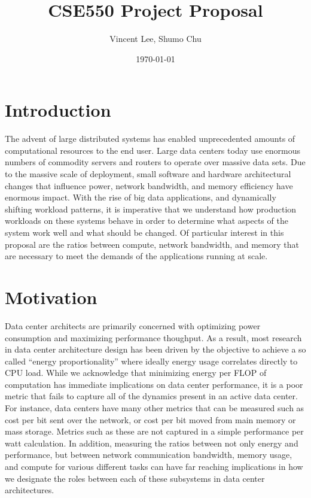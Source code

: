 \documentclass{article}
\begin{document}
\title{CSE550 Project Proposal}
\author{Vincent Lee, Shumo Chu}
\date{\today}

\maketitle

\tableofcontents


\section{Introduction}

The advent of large distributed systems has enabled unprecedented amounts of computational resources to the end user.
Large data centers today use enormous numbers of commodity servers and routers to operate over massive data sets.
Due to the massive scale of deployment, small software and hardware architectural changes that influence power, network bandwidth, and memory efficiency have enormous impact.
With the rise of big data applications, and dynamically shifting workload patterns, it is imperative that we understand how production workloads on these systems behave in order to determine what aspects of the system work well and what should be changed.
Of particular interest in this proposal are the ratios between compute, network bandwidth, and memory that are necessary to meet the demands of the applications running at scale.

\section{Motivation}

Data center architects are primarily concerned with optimizing power consumption and maximizing performance thoughput.
As a result, most research in data center architecture design has been driven by the objective to achieve a so called ``energy proportionality'' where ideally energy usage correlates directly to CPU load. 
While we acknowledge that minimizing energy per FLOP of computation has immediate implications on data center performance, it is a poor metric that fails to capture all of the dynamics present in an active data center.
For instance, data centers have many other metrics that can be measured such as cost per bit sent over the network, or cost per bit moved from main memory or mass storage.
Metrics such as these are not captured in a simple performance per watt calculation.
In addition, measuring the ratios between not only energy and performance, but between network communication bandwidth, memory usage, and compute for various different tasks can have far reaching implications in how we designate the roles between each of these subsystems in data center architectures.
\end{document}
